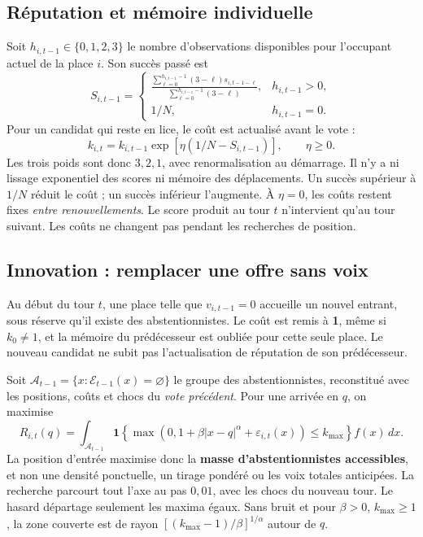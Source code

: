 \documentclass[11pt,a4paper]{article}
\begin{document}
\subsection{Réputation et mémoire individuelle}
Soit $h_{i,t-1}\in\{0,1,2,3\}$ le nombre d'observations disponibles
pour l'occupant actuel de la place $i$. Son succès passé est
\[
S_{i,t-1}=
\begin{cases}
\displaystyle\frac{\sum_{\ell=0}^{h_{i,t-1}-1}(3-\ell)s_{i,t-1-\ell}}
{\sum_{\ell=0}^{h_{i,t-1}-1}(3-\ell)},&h_{i,t-1}>0,\\[6pt]
1/N,&h_{i,t-1}=0.
\end{cases}
\]
Pour un candidat qui reste en lice, le coût est actualisé avant le vote :
\begin{equation}\label{eq:reputation}
\boxed{k_{i,t}=k_{i,t-1}\exp[\eta(1/N-S_{i,t-1})]},\qquad\eta\geq0.
\end{equation}
Les trois poids sont donc $3,2,1$, avec renormalisation au démarrage.
Il n'y a ni lissage exponentiel des scores ni mémoire des déplacements.
Un succès supérieur à $1/N$ réduit le coût ; un succès inférieur
l'augmente. À $\eta=0$, les coûts restent fixes \emph{entre renouvellements}.
Le score produit au tour $t$ n'intervient qu'au tour suivant.
Les coûts ne changent pas pendant les recherches de position.

\subsection{Innovation : remplacer une offre sans voix}
Au début du tour $t$, une place telle que $v_{i,t-1}=0$ accueille un
nouvel entrant, sous réserve qu'il existe des abstentionnistes.
Le coût est remis à \textbf{1}, même si $k_0\neq1$, et la mémoire du
prédécesseur est oubliée pour cette seule place. Le nouveau candidat
ne subit pas l'actualisation de réputation de son prédécesseur.

Soit $\mathcal A_{t-1}=\{x:\mathcal E_{t-1}(x)=\varnothing\}$ le groupe
des abstentionnistes, reconstitué avec les positions, coûts et chocs du
\emph{vote précédent}. Pour une arrivée en $q$, on maximise
\begin{equation}\label{eq:entry}
R_{i,t}(q)=\int_{\mathcal A_{t-1}}
\mathbf1\!\left\{\max(0,1+\beta|x-q|^\alpha+
\varepsilon_{i,t}(x))\leq k_{\max}\right\}f(x)\,dx.
\end{equation}
La position d'entrée maximise donc la \textbf{masse d'abstentionnistes
accessibles}, et non une densité ponctuelle, un tirage pondéré ou les
voix totales anticipées. La recherche parcourt tout l'axe au pas $0{,}01$,
avec les chocs du nouveau tour. Le hasard départage seulement les maxima
égaux. Sans bruit et pour $\beta>0$, $k_{\max}\geq1$, la zone couverte
est de rayon $[(k_{\max}-1)/\beta]^{1/\alpha}$ autour de $q$.
\end{document}
